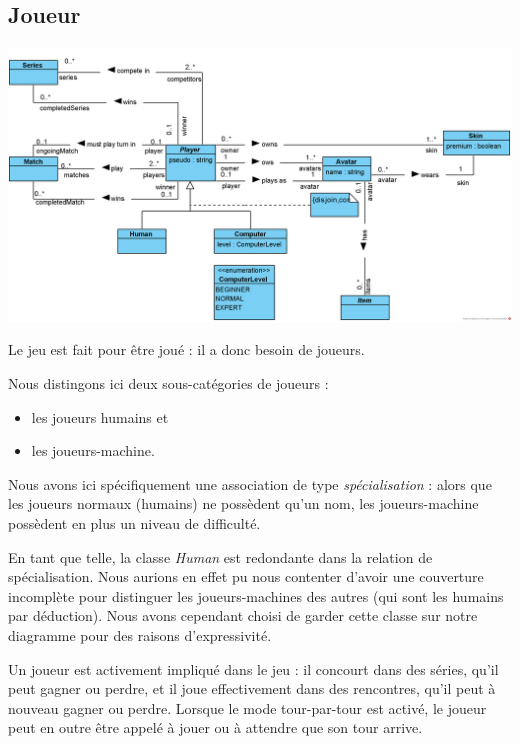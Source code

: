 \documentclass[oneside,a4paper]{book}
\begin{document}
\subsection{Joueur}

\includegraphics[width=\textwidth,height=\textheight,keepaspectratio]{Diagrams/DJ-Player.png}\newline

Le jeu est fait pour être joué : il a donc besoin de joueurs. 

Nous distingons ici deux sous-catégories de joueurs :
\begin{itemize}
    \item les joueurs humains et
    \item les joueurs-machine.
\end{itemize}

Nous avons ici spécifiquement une association de type \textit{spécialisation} : alors que les joueurs normaux (humains) ne possèdent qu'un nom, les joueurs-machine possèdent en plus un niveau de difficulté.
\begin{tcolorbox}
    En tant que telle, la classe \textit{Human} est redondante dans la relation de spécialisation. Nous aurions en effet pu nous contenter d'avoir une couverture incomplète pour distinguer les joueurs-machines des autres (qui sont les humains par déduction). Nous avons cependant choisi de garder cette classe sur notre diagramme pour des raisons d'expressivité.
\end{tcolorbox}

Un joueur est activement impliqué dans le jeu : il concourt dans des séries, qu'il peut gagner ou perdre, et il joue effectivement dans des rencontres, qu'il peut à nouveau gagner ou perdre. Lorsque le mode tour-par-tour est activé, le joueur peut en outre être appelé à jouer ou à attendre que son tour arrive. \newline
\end{document}
